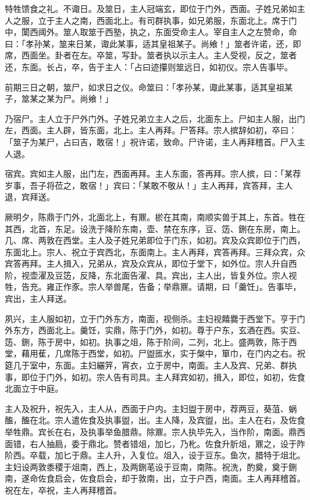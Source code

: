 \documentclass[]{article}
\begin{document}
特牲馈食之礼。不诹日。及筮日，主人冠端玄，即位于门外，西面。子姓兄弟如主人之服，立于主人之南，西面北上。有司群执事，如兄弟服，东面北上。席于门中，闑西阈外。筮人取筮于西塾，执之，东面受命主人。宰自主人之左赞命，命曰：「孝孙某，筮来日某，诹此某事，适其皇祖某子。尚飨！」筮者许诺，还，即席，西面坐。卦者在左。卒筮，写卦。筮者执以示主人。主人受视，反之，筮者还，东面。长占，卒，告于主人：「占曰迹攥则筮远日，如初仪。宗人告事毕。

前期三日之朝，筮尸，如求日之仪。命筮曰：「孝孙某，诹此某事，适其皇祖某子，筮某之某为尸。尚飨！」

乃宿尸。主人立于尸外门外。子姓兄弟立主人之后，北面东上。尸如主人服，出门左，西面。主人辟，皆东面，北上。主人再拜。尸答拜。宗人摈辞如初，卒曰：「筮子为某尸，占曰吉，敢宿！」祝许诺，致命。尸许诺，主人再拜稽首。尸入主人退。

宿宾。宾如主人服，出门左，西面再拜。主人东面，答再拜。宗人摈，曰：「某荐岁事，吾子将莅之，敢宿！」宾曰：「某敢不敬从！」主人再拜，宾答拜，主人退，宾拜送。

厥明夕，陈鼎于门外，北面北上，有鼏。棜在其南，南顺实兽于其上，东首。牲在其西，北首，东足。设洗于降阶东南，壶、禁在东序，豆、笾、鉶在东房，南上。几、席、两敦在西堂。主人及子姓兄弟即位于门东，如初。宾及众宾即位于门西，东面北上。宗人、祝立于宾西北，东面南上。主人再拜，宾答再拜。三拜众宾，众宾答再拜。主人揖入，兄弟从，宾及众宾从，即位于堂下，如外位。宗人升自西阶，视壶濯及豆笾，反降，东北面告濯、具。宾出，主人出，皆复外位。宗人视牲，告充。雍正作豕。宗人举兽尾，告备；举鼎鼏。请期，曰「羹饪」。告事毕，宾出，主人拜送。

夙兴，主人服如初，立于门外东方，南面，视侧杀。主妇视饎爨于西堂下。亨于门外东方，西面北上。羹饪，实鼎，陈于门外，如初。尊于户东，玄酒在西。实豆、笾、鉶，陈于房中，如初。执事之俎，陈于阶间，二列，北上。盛两敦，陈于西堂，藉用萑，几席陈于西堂，如初。尸盥匜水，实于槃中，箪巾，在门内之右。祝筵几于室中，东面。主妇纚笄，宵衣，立于房中，南面。主人及宾、兄弟、群执事，即位于门外，如初。宗人告有司具。主人拜宾如初，揖入，即位，如初，佐食北面立于中庭。

主人及祝升，祝先入，主人从，西面于户内。主妇盥于房中，荐两豆，葵菹、蜗醢，醢在北。宗人遣佐食及执事盥，出。主人降，及宾盥，出。主人在右，及佐食举牲鼎。宾长在右，及执事举鱼腊鼎。除鼏。宗人执毕先入，当作阶，南面。鼎西面错，右人抽扃，委于鼎北。赞者错俎，加匕，乃朼。佐食升肵俎，鼏之，设于阼阶西。卒载，加匕于鼎。主人升，入复位。俎入，设于豆东。鱼次，腊特于俎北。主妇设两敦黍稷于俎南，西上，及两鉶芼设于豆南，南陈。祝洗，酌奠，奠于鉶南，遂命佐食启会，佐食启会，却于敦南，出，立于户西，南面。主人再拜稽首。祝在左，卒祝，主人再拜稽首。
\end{document}
